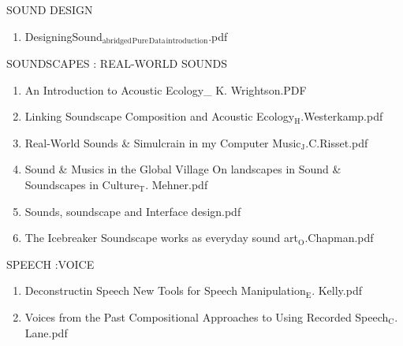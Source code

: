 \documentclass[11pt]{article}
\begin{document}
\item SOUND DESIGN
\label{sec-1-1-1-1-49-1-33}
\begin{enumerate}
\item DesigningSound$_{\text{abridged}}$$_{\text{Pure}}$$_{\text{Data}}$$_{\text{introduction}}$.pdf
\label{sec-1-1-1-1-49-1-33-1}
\end{enumerate}

\item SOUNDSCAPES : REAL-WORLD SOUNDS
\label{sec-1-1-1-1-49-1-34}
\begin{enumerate}
\item An Introduction to Acoustic Ecology\_ K. Wrightson.PDF
\label{sec-1-1-1-1-49-1-34-1}

\item Linking Soundscape Composition and Acoustic Ecology$_{\text{H}}$.Westerkamp.pdf
\label{sec-1-1-1-1-49-1-34-2}

\item Real-World Sounds \& Simulcrain in my Computer Music$_{\text{J}}$.C.Risset.pdf
\label{sec-1-1-1-1-49-1-34-3}

\item Sound \& Musics in the Global Village On landscapes in Sound \& Soundscapes in Culture$_{\text{T}}$. Mehner.pdf
\label{sec-1-1-1-1-49-1-34-4}

\item Sounds, soundscape and Interface design.pdf
\label{sec-1-1-1-1-49-1-34-5}

\item The Icebreaker Soundscape works as everyday sound art$_{\text{O}}$.Chapman.pdf
\label{sec-1-1-1-1-49-1-34-6}
\end{enumerate}

\item SPEECH :VOICE
\label{sec-1-1-1-1-49-1-35}
\begin{enumerate}
\item Deconstructin Speech New Tools for Speech Manipulation$_{\text{E}}$. Kelly.pdf
\label{sec-1-1-1-1-49-1-35-1}

\item Voices from the Past Compositional Approaches to Using Recorded Speech$_{\text{C}}$. Lane.pdf
\label{sec-1-1-1-1-49-1-35-2}
\end{enumerate}
\end{document}

